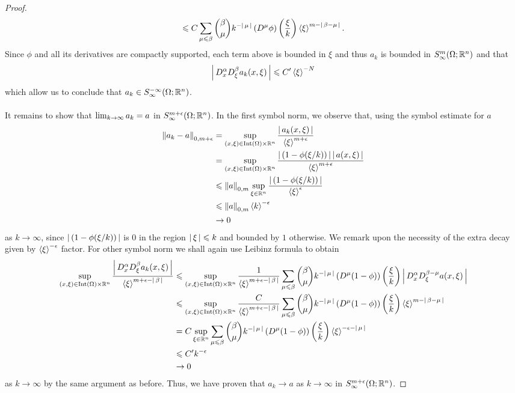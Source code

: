 \documentclass{article}
\begin{document}
\begin{proof}
\[     \leq C \sum_{\mu \leq \beta} \binom{\beta}{\mu}k^{-\abs{\mu}} \brac{D^\mu \phi}\brac{\frac{\xi}{k}} \sym[\xi]^{m - \abs{\beta - \mu}}. 
     \] 
     Since $\phi$ and all its derivatives are compactly supported, each term above is bounded in $\xi$ and thus $a_k$ is bounded in $S^{m}_\infty(\Omega; \R^n)$ and that 
     \[
     \abs{D^\alpha_x D^\beta_\xi a_k(x, \xi)} \leq C' \sym[\xi]^{-N}
     \]
     which allow us to conclude that $a_k \in S^{-\infty}_\infty(\Omega; \R^n)$.\\
     \\
     It remains to show that $\Lim[k] a_k = a $ in $S^{m + \epsilon}_\infty(\Omega; \R^n)$. In the first symbol norm, we observe that, using the symbol estimate for $a$ 
     \begin{align*}
     \norm[a_k - a]_{0, m + \epsilon} 
     & = \sup_{(x, \xi) \in \mathrm{Int}(\Omega) \times \R^n} \frac{\abs{a_k(x, \xi)}}{\sym[\xi]^{m + \epsilon}} \\
     & = \sup_{(x, \xi) \in \mathrm{Int}(\Omega) \times \R^n} \frac{\abs{(1- \phi(\xi/k))} \abs{a(x, \xi)}}{\sym[\xi]^{m + \epsilon}} \\
     & \leq \norm[a]_{0, m} \sup_{\xi \in \R^n} \frac{\abs{(1- \phi(\xi/k))}}{\sym[\xi]^{\epsilon}} \\
     & \leq \norm[a]_{0, m} \sym[k]^{- \epsilon}\\
     & \to 0
     \end{align*}
     as $k \to \infty$, since $\abs{( 1- \phi(\xi/ k))}$ is 0 in the region $\abs{\xi} \leq k$ and bounded by $1$ otherwise.  We remark upon the necessity of the extra decay given by $\sym[\xi]^{-\epsilon}$ factor. For other symbol norm we shall again use Leibinz formula to obtain 
     \begin{align*}
     \sup_{(x, \xi) \in \mathrm{Int}(\Omega) \times \R^n} \frac{\abs{D^\alpha_x D^\beta_\xi a_k(x, \xi)}}{\sym[\xi]^{m + \epsilon - \abs{\beta}}} 
     & \leq \sup_{(x, \xi) \in \mathrm{Int}(\Omega) \times \R^n} \frac{1}{\sym[\xi]^{m + \epsilon - \abs{\beta}}} \sum_{\mu \leq \beta} \binom{\beta}{\mu}k^{-\abs{\mu}} \brac{D^\mu (1 - \phi)}\brac{\frac{\xi}{k}} \abs{D^\alpha_x D^{\beta - \mu}_\xi a(x, \xi) } \\
     & \leq  \sup_{(x, \xi) \in \mathrm{Int}(\Omega) \times \R^n} \frac{C}{\sym[\xi]^{m + \epsilon - \abs{\beta}}} \sum_{\mu \leq \beta} \binom{\beta}{\mu}k^{-\abs{\mu}} \brac{D^\mu (1 - \phi)}\brac{\frac{\xi}{k}} \sym[\xi]^{m - \abs{\beta - \mu}}  \\
     & = C \sup_{\xi \in \R^n} \sum_{\mu \leq \beta} \binom{\beta}{\mu}k^{-\abs{\mu}} \brac{D^\mu (1 - \phi)}\brac{\frac{\xi}{k}} \sym[\xi]^{- \epsilon - \abs{\mu}}  \\
     & \leq C' k^{- \epsilon} \\
     & \to 0
     \end{align*}
     as $k \to \infty$ by the same argument as before. Thus, we have proven that $a_k \to a$ as $k \to \infty$ in $S^{m + \epsilon}_\infty(\Omega; \R^n)$. 
    
\end{proof}
\end{document}
